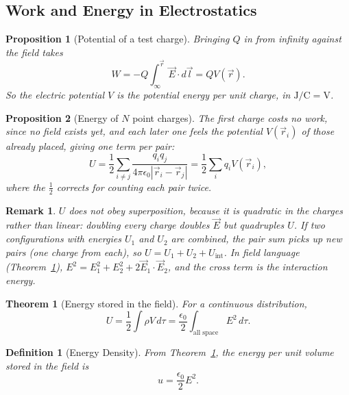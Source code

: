 \documentclass{article}
\newtheorem{theorem}{Theorem}
\newtheorem{definition}{Definition}
\newtheorem{remark}{Remark}
\newtheorem{proposition}{Proposition}
\begin{document}
\subsection{Work and Energy in Electrostatics}
\begin{proposition}[Potential of a test charge]
    Bringing $Q$ in from infinity against the field takes
    \begin{equation}
        W = -Q\int_\infty^{\vec{r}}\vec{E}\cdot d\vec{l} = QV(\vec{r}).
    \end{equation}
    So the electric potential $V$ is the potential energy per unit charge, in $\mathrm{J/C} = \mathrm{V}$.
\end{proposition}
\begin{proposition}[Energy of $N$ point charges]
    The first charge costs no work, since no field exists yet, and each later one feels the potential $V(\vec{r}_i)$ of those already placed, giving one term per pair:
    \begin{equation}
        U = \frac{1}{2}\sum_{i\neq j}\frac{q_iq_j}{4\pi\epsilon_0|\vec{r}_i - \vec{r}_j|} = \frac{1}{2}\sum_iq_iV(\vec{r}_i),
    \end{equation}
    where the $\tfrac12$ corrects for counting each pair twice.
\end{proposition}
\begin{remark}
    $U$ does not obey superposition, because it is quadratic in the charges rather than linear: doubling every charge doubles $\vec{E}$ but quadruples $U$. If two configurations with energies $U_1$ and $U_2$ are combined, the pair sum picks up new pairs (one charge from each), so $U = U_1 + U_2 + U_{\text{int}}$. In field language (Theorem~\ref{E-stored-in-field}), $E^2 = E_1^2 + E_2^2 + 2\vec{E}_1\cdot\vec{E}_2$, and the cross term is the interaction energy.
\end{remark}
\begin{theorem}[Energy stored in the field]
    \label{E-stored-in-field}
    For a continuous distribution,
    \begin{equation}
        U = \frac{1}{2}\int\rho V\,d\tau = \frac{\epsilon_0}{2}\int_{\text{all space}} E^2\,d\tau.
    \end{equation}
\end{theorem}
\begin{definition}[Energy Density]
    From Theorem~\ref{E-stored-in-field}, the energy per unit volume stored in the field is
    \begin{equation}
        u = \frac{\epsilon_0}{2}E^2.
    \end{equation}
\end{definition}
\end{document}
